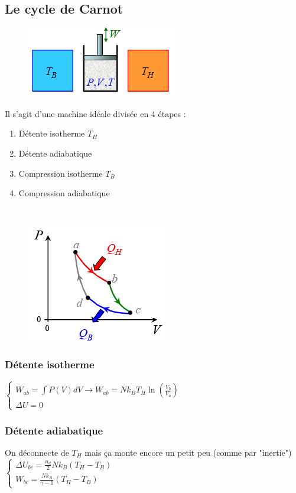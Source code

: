 \documentclass	[11pt, a4paper, openany]{book}
\begin{document}
\subsection{Le cycle de Carnot}
\begin{figure}
	\includegraphics[scale=0.64]{th/image16.png}
\end{figure}
Il s'agit d'une machine idéale divisée en 4 étapes :
\begin{enumerate}
	\item Détente isotherme $T_H$
	\item Détente adiabatique
	\item Compression isotherme $T_B$
	\item Compression adiabatique
\end{enumerate}
\ \\
\begin{figure}
	\includegraphics[scale=0.54]{th/image17.png}
\end{figure}
\subsubsection{Détente isotherme}
$\left\{\begin{array}{l}
W_{ab} = \int P(V)dV \rightarrow W_{ab} = Nk_BT_H\ln\left(\frac{V_b}{V_a}\right)\\
\Delta U = 0
\end{array}\right.$

\subsubsection{Détente adiabatique}
On déconnecte de $T_H$ mais ça monte encore un petit peu (comme par "inertie")\\
$\left\{\begin{array}{l}
\Delta U_{bc} = \frac{n_d}{2}Nk_B(T_H-T_B)\\
W_{bc} = \frac{Nk_B}{\gamma - 1}(T_H - T_B)
\end{array}\right.$
\end{document}
